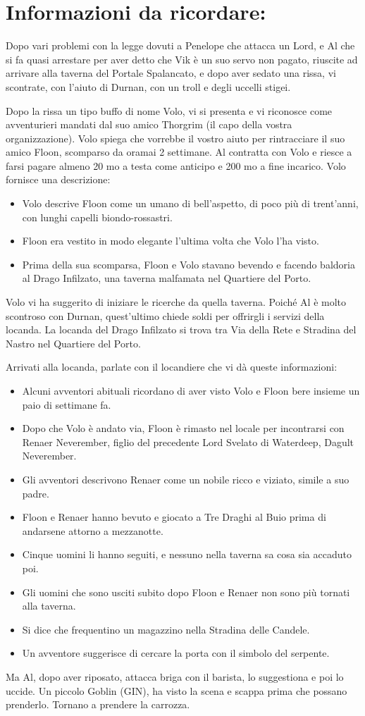 \documentclass{article}
\begin{document}
\section*{Informazioni da ricordare:}

Dopo vari problemi con la legge dovuti a Penelope che attacca un Lord, e Al che si fa quasi arrestare per aver detto che Vik è un suo servo non pagato, riuscite ad arrivare alla taverna del Portale Spalancato, e dopo aver sedato una rissa, vi scontrate, con l'aiuto di Durnan, con un troll e degli uccelli stigei. 


Dopo la rissa un tipo buffo di nome Volo, vi si presenta e vi riconosce come avventurieri mandati dal suo amico Thorgrim (il capo della vostra organizzazione). Volo spiega che vorrebbe il vostro aiuto per rintracciare il suo amico Floon, scomparso da oramai 2 settimane. Al contratta con Volo e riesce a farsi pagare almeno 20 mo a testa come anticipo e 200 mo a fine incarico. Volo fornisce una descrizione: 
\begin{itemize}
    \item Volo descrive Floon come un umano di bell’aspetto, di poco più di trent’anni, con lunghi capelli biondo-rossastri.
    \item Floon era vestito in modo elegante l’ultima volta che Volo l’ha visto.
    \item Prima della sua scomparsa, Floon e Volo stavano bevendo e facendo baldoria al Drago Infilzato, una taverna malfamata nel Quartiere del Porto.
\end{itemize}
Volo vi ha suggerito di iniziare le ricerche da quella taverna. Poiché Al è molto scontroso con Durnan, quest'ultimo chiede soldi per offrirgli i servizi della locanda. La locanda del Drago Infilzato si trova tra Via della Rete e Stradina del Nastro nel Quartiere del Porto.

Arrivati alla locanda, parlate con il locandiere che vi dà queste informazioni: 
\begin{itemize}
    \item Alcuni avventori abituali ricordano di aver visto Volo e Floon bere insieme un paio di settimane fa.
    \item Dopo che Volo è andato via, Floon è rimasto nel locale per incontrarsi con Renaer Neverember, figlio del precedente Lord Svelato di Waterdeep, Dagult Neverember.
    \item Gli avventori descrivono Renaer come un nobile ricco e viziato, simile a suo padre.
    \item Floon e Renaer hanno bevuto e giocato a Tre Draghi al Buio prima di andarsene attorno a mezzanotte.
    \item Cinque uomini li hanno seguiti, e nessuno nella taverna sa cosa sia accaduto poi.
    \item Gli uomini che sono usciti subito dopo Floon e Renaer non sono più tornati alla taverna.
    \item Si dice che frequentino un magazzino nella Stradina delle Candele.
    \item Un avventore suggerisce di cercare la porta con il simbolo del serpente.
\end{itemize}


Ma Al, dopo aver riposato, attacca briga con il barista, lo suggestiona e poi lo uccide. Un piccolo Goblin (GIN), ha visto la scena e scappa prima che possano prenderlo. Tornano a prendere la carrozza.
\end{document}
